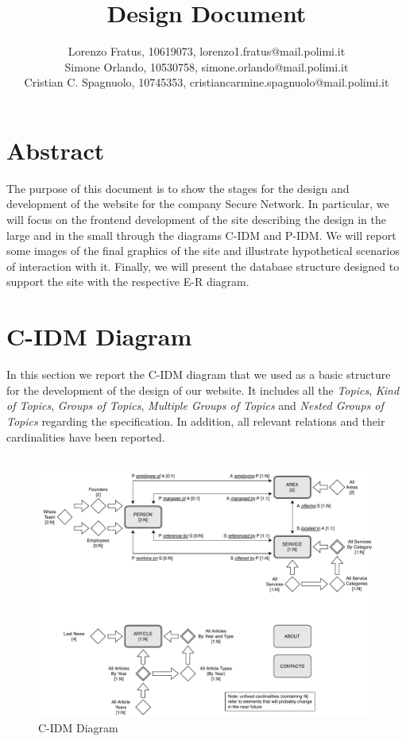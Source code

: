 \documentclass[12pt]{report}
\title{Design Document}
\author{Lorenzo Fratus, 10619073, lorenzo1.fratus@mail.polimi.it \\
Simone Orlando, 10530758, simone.orlando@mail.polimi.it \\
Cristian C. Spagnuolo, 10745353, cristiancarmine.spagnuolo@mail.polimi.it}
\begin{document}
\maketitle
\tableofcontents

\chapter{Abstract}
The purpose of this document is to show the stages for the design and 
development of the website for the company Secure Network. 
In particular, we will focus on the frontend development of 
the site describing the design in the large and in the small 
through the diagrams C-IDM and P-IDM. 
We will report some images of the final graphics of the site and 
illustrate hypothetical scenarios of interaction with it. 
Finally, we will present the database structure designed to support the site with the 
respective E-R diagram.

\chapter{C-IDM Diagram}
In this section we report the C-IDM diagram that we used as a basic structure for 
the development of the design of our website. It includes all the \emph{Topics}, 
\emph{Kind of Topics}, \emph{Groups of Topics}, \emph{Multiple Groups of Topics} and
\emph{Nested Groups of Topics} regarding the specification. In addition, all relevant 
relations and their cardinalities have been reported.\\\\
\begin{figure}[h]
	\centering
	\includegraphics[width=\textwidth]{C-IDM.pdf}
	\caption{C-IDM Diagram}
\end{figure}
\end{document}
